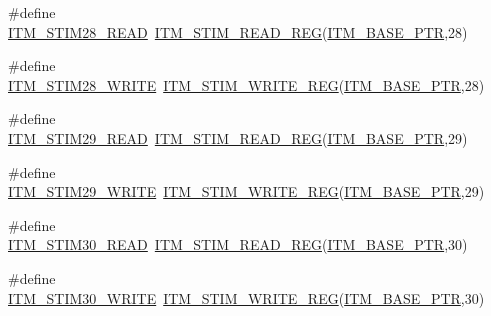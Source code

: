 \begin{DoxyCompactItemize}
\item 
\#define \hyperlink{group___i_t_m___register___accessor___macros_gaeedb9934131b7f1d727aab5f0282751f}{I\+T\+M\+\_\+\+S\+T\+I\+M28\+\_\+\+R\+E\+AD}~\hyperlink{group___i_t_m___register___accessor___macros_ga5009882336aadcd4f37b45cf3395c450}{I\+T\+M\+\_\+\+S\+T\+I\+M\+\_\+\+R\+E\+A\+D\+\_\+\+R\+EG}(\hyperlink{group___i_t_m___peripheral_gafaddee8fe8b6a898d4e5edc43ee0d703}{I\+T\+M\+\_\+\+B\+A\+S\+E\+\_\+\+P\+TR},28)
\item 
\#define \hyperlink{group___i_t_m___register___accessor___macros_gadf3581234ae31f01dc8bbc5fe2d5fa06}{I\+T\+M\+\_\+\+S\+T\+I\+M28\+\_\+\+W\+R\+I\+TE}~\hyperlink{group___i_t_m___register___accessor___macros_ga049ca92a4e78e77c19af81e51aa73f1c}{I\+T\+M\+\_\+\+S\+T\+I\+M\+\_\+\+W\+R\+I\+T\+E\+\_\+\+R\+EG}(\hyperlink{group___i_t_m___peripheral_gafaddee8fe8b6a898d4e5edc43ee0d703}{I\+T\+M\+\_\+\+B\+A\+S\+E\+\_\+\+P\+TR},28)
\item 
\#define \hyperlink{group___i_t_m___register___accessor___macros_ga91514a35de0d63d08518557abf3a4092}{I\+T\+M\+\_\+\+S\+T\+I\+M29\+\_\+\+R\+E\+AD}~\hyperlink{group___i_t_m___register___accessor___macros_ga5009882336aadcd4f37b45cf3395c450}{I\+T\+M\+\_\+\+S\+T\+I\+M\+\_\+\+R\+E\+A\+D\+\_\+\+R\+EG}(\hyperlink{group___i_t_m___peripheral_gafaddee8fe8b6a898d4e5edc43ee0d703}{I\+T\+M\+\_\+\+B\+A\+S\+E\+\_\+\+P\+TR},29)
\item 
\#define \hyperlink{group___i_t_m___register___accessor___macros_gaf42116fa71e252ae421c078e1de7058b}{I\+T\+M\+\_\+\+S\+T\+I\+M29\+\_\+\+W\+R\+I\+TE}~\hyperlink{group___i_t_m___register___accessor___macros_ga049ca92a4e78e77c19af81e51aa73f1c}{I\+T\+M\+\_\+\+S\+T\+I\+M\+\_\+\+W\+R\+I\+T\+E\+\_\+\+R\+EG}(\hyperlink{group___i_t_m___peripheral_gafaddee8fe8b6a898d4e5edc43ee0d703}{I\+T\+M\+\_\+\+B\+A\+S\+E\+\_\+\+P\+TR},29)
\item 
\#define \hyperlink{group___i_t_m___register___accessor___macros_ga24e46238f0f743da6b080a2cbb500ff5}{I\+T\+M\+\_\+\+S\+T\+I\+M30\+\_\+\+R\+E\+AD}~\hyperlink{group___i_t_m___register___accessor___macros_ga5009882336aadcd4f37b45cf3395c450}{I\+T\+M\+\_\+\+S\+T\+I\+M\+\_\+\+R\+E\+A\+D\+\_\+\+R\+EG}(\hyperlink{group___i_t_m___peripheral_gafaddee8fe8b6a898d4e5edc43ee0d703}{I\+T\+M\+\_\+\+B\+A\+S\+E\+\_\+\+P\+TR},30)
\item 
\#define \hyperlink{group___i_t_m___register___accessor___macros_ga04082ae600d9a3012f4c9861fe7d0ea3}{I\+T\+M\+\_\+\+S\+T\+I\+M30\+\_\+\+W\+R\+I\+TE}~\hyperlink{group___i_t_m___register___accessor___macros_ga049ca92a4e78e77c19af81e51aa73f1c}{I\+T\+M\+\_\+\+S\+T\+I\+M\+\_\+\+W\+R\+I\+T\+E\+\_\+\+R\+EG}(\hyperlink{group___i_t_m___peripheral_gafaddee8fe8b6a898d4e5edc43ee0d703}{I\+T\+M\+\_\+\+B\+A\+S\+E\+\_\+\+P\+TR},30)

\end{DoxyCompactItemize}
